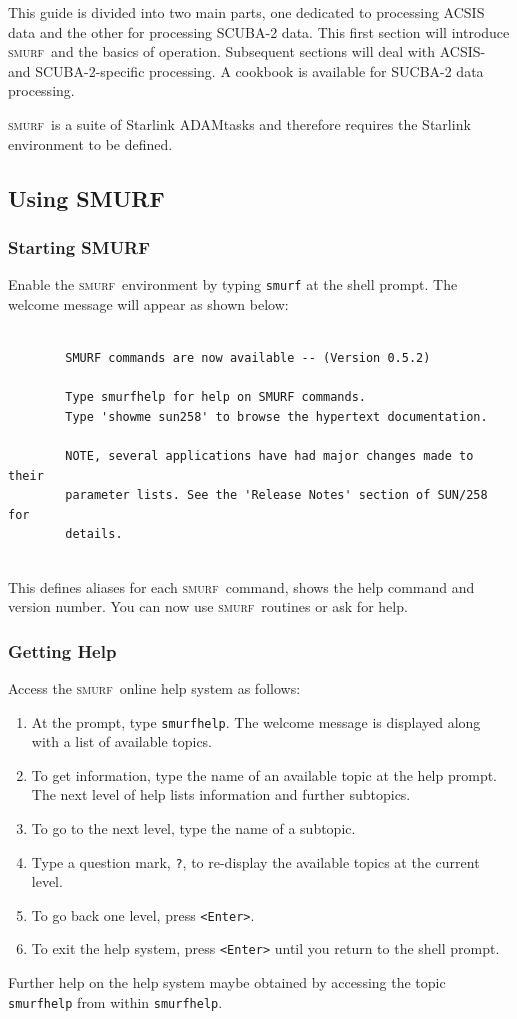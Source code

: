 \documentclass[twoside,11pt]{article}
\newcommand{\xref}[3]{#1}
\renewcommand{\_}{\texttt{\symbol{95}}}
\newcommand{\SMURF}{\textsc{smurf}}
\newcommand{\ADAM}{\xref{ADAM}{sg4}}
\begin{document}
This guide is divided into two main parts, one dedicated to processing
ACSIS data and the other for processing SCUBA-2 data. This first
section will introduce \SMURF\ and the basics of operation. Subsequent
sections will deal with ACSIS- and SCUBA-2-specific processing. A
cookbook is available for SUCBA-2 data processing.

\SMURF\ is a suite of Starlink \ADAM\ tasks and therefore
requires the Starlink environment to be defined.

\subsection{Using SMURF}

\subsubsection{Starting SMURF}

Enable the \SMURF\ environment by typing \verb+smurf+ at the shell
prompt. The welcome message will appear as shown below:
\begin{verbatim}

        SMURF commands are now available -- (Version 0.5.2)

        Type smurfhelp for help on SMURF commands.
        Type 'showme sun258' to browse the hypertext documentation.

        NOTE, several applications have had major changes made to their
        parameter lists. See the 'Release Notes' section of SUN/258 for
        details.


\end{verbatim}
This defines aliases for each \SMURF\ command, shows the help command
and version number. You can now use \SMURF\ routines or ask for help.

\subsubsection{Getting Help}

Access the \SMURF\ online help system as follows:
\begin{enumerate}
\item At the prompt, type \verb+smurfhelp+. The welcome message is
  displayed along with a list of available topics.
\item To get information, type the name of an available topic at the
  help prompt.  The next level of help lists information and further
  subtopics.
\item To go to the next level, type the name of a subtopic.
\item Type a question mark, \verb+?+, to re-display the available
  topics at the current level.
\item To go back one level, press \verb+<Enter>+.
\item To exit the help system, press \verb+<Enter>+ until you return
  to the shell prompt.
\end{enumerate}
Further help on the help system maybe obtained by accessing the topic
\verb+smurfhelp+ from within \verb+smurfhelp+.
\end{document}
